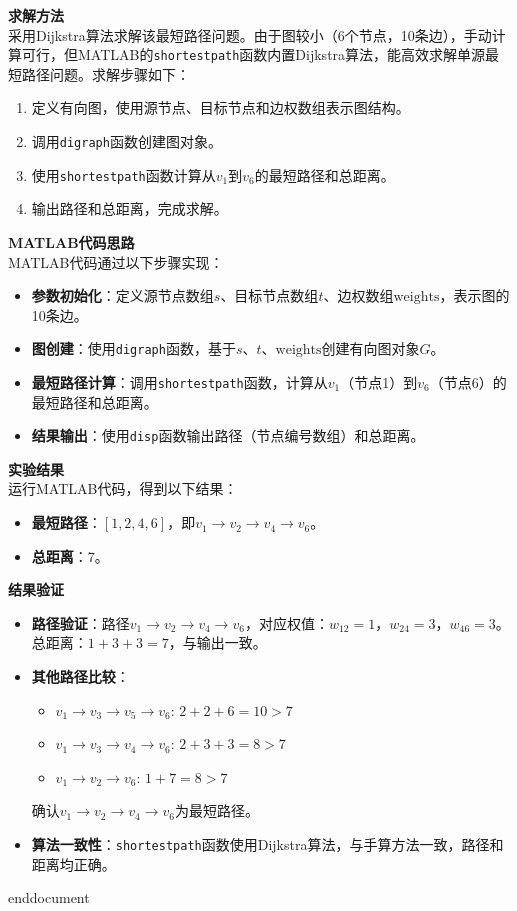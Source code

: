 \textbf{求解方法}\\
采用Dijkstra算法求解该最短路径问题。由于图较小（6个节点，10条边），手动计算可行，但MATLAB的\texttt{shortestpath}函数内置Dijkstra算法，能高效求解单源最短路径问题。求解步骤如下：
\begin{enumerate}
    \item 定义有向图，使用源节点、目标节点和边权数组表示图结构。
    \item 调用\texttt{digraph}函数创建图对象。
    \item 使用\texttt{shortestpath}函数计算从\( v_1 \)到\( v_6 \)的最短路径和总距离。
    \item 输出路径和总距离，完成求解。
\end{enumerate}

\textbf{MATLAB代码思路}\\
MATLAB代码通过以下步骤实现：
\begin{itemize}
    \item \textbf{参数初始化}：定义源节点数组\( s \)、目标节点数组\( t \)、边权数组\( \text{weights} \)，表示图的10条边。
    \item \textbf{图创建}：使用\texttt{digraph}函数，基于\( s \)、\( t \)、\( \text{weights} \)创建有向图对象\( G \)。
    \item \textbf{最短路径计算}：调用\texttt{shortestpath}函数，计算从\( v_1 \)（节点1）到\( v_6 \)（节点6）的最短路径和总距离。
    \item \textbf{结果输出}：使用\texttt{disp}函数输出路径（节点编号数组）和总距离。
\end{itemize}

\textbf{实验结果}\\
运行MATLAB代码，得到以下结果：
\begin{itemize}
    \item \textbf{最短路径}：\( [1, 2, 4, 6] \)，即\( v_1 \to v_2 \to v_4 \to v_6 \)。
    \item \textbf{总距离}：7。
\end{itemize}

\textbf{结果验证}
\begin{itemize}
    \item \textbf{路径验证}：路径\( v_1 \to v_2 \to v_4 \to v_6 \)，对应权值：\( w_{12} = 1 \)，\( w_{24} = 3 \)，\( w_{46} = 3 \)。总距离：\( 1 + 3 + 3 = 7 \)，与输出一致。
    \item \textbf{其他路径比较}：
    \begin{itemize}
        \item \( v_1 \to v_3 \to v_5 \to v_6 \): \( 2 + 2 + 6 = 10 > 7 \)
        \item \( v_1 \to v_3 \to v_4 \to v_6 \): \( 2 + 3 + 3 = 8 > 7 \)
        \item \( v_1 \to v_2 \to v_6 \): \( 1 + 7 = 8 > 7 \)
    \end{itemize}
    确认\( v_1 \to v_2 \to v_4 \to v_6 \)为最短路径。
    \item \textbf{算法一致性}：\texttt{shortestpath}函数使用Dijkstra算法，与手算方法一致，路径和距离均正确。
\end{itemize}

\ifx\allfiles\undefined
    
    
    
    end{document}
    \else
    \fi